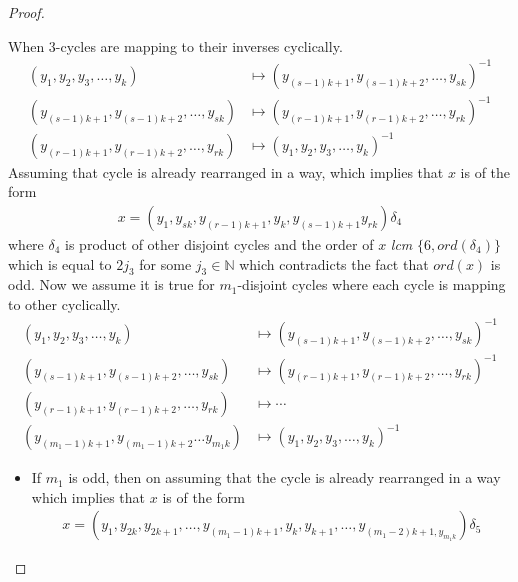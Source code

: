 \documentclass[10pt,a4paper]{amsart}
\newcommand{\ord}{ord}
\begin{document}
\begin{proof}
\begin{itemize}
\begin{itemize}
                    When $3$-cycles are mapping to their inverses cyclically.
                    \begin{align*}
                        (y_1, y_2, y_3, \ldots , y_k) &\mapsto (y_{(s- 1)k + 1}, y_{(s- 1)k + 2}, \ldots , y_{sk})^{-1}\\
                        (y_{(s- 1)k + 1}, y_{(s- 1)k + 2}, \ldots , y_{sk})&\mapsto (y_{(r- 1)k + 1}, y_{(r- 1)k + 2}, \ldots , y_{rk})^{-1}\\
                        (y_{(r- 1)k + 1}, y_{(r- 1)k + 2}, \ldots , y_{rk})&\mapsto (y_1, y_2, y_3, \ldots , y_k)^{-1}
                    \end{align*} Assuming that cycle is already rearranged in a way, which implies that $x$ is of the form
                    \begin{align*}
                        x = (y_1, y_{sk}, y_{(r - 1)k + 1}, y_k, y_{(s - 1)k + 1}y_{rk})\delta_4
                    \end{align*}
                    where $\delta_4$ is product of other disjoint cycles and the order of $x$ \textit{lcm} $\{6, \ord(\delta_4)\}$ which is equal to $2j_3$ for some $j_3 \in \mathbb{N}$ which contradicts the fact that $\ord(x)$ is odd. Now we assume it is true for $m_1$-disjoint cycles where each cycle is mapping to other cyclically.
                    \begin{align*}
                        (y_1, y_2, y_3, \ldots , y_k) &\mapsto (y_{(s- 1)k + 1}, y_{(s- 1)k + 2}, \ldots , y_{sk})^{-1}\\
                        (y_{(s- 1)k + 1}, y_{(s- 1)k + 2}, \ldots , y_{sk})&\mapsto (y_{(r- 1)k + 1}, y_{(r- 1)k + 2}, \ldots , y_{rk})^{-1}\\
                        (y_{(r- 1)k + 1}, y_{(r- 1)k + 2}, \ldots , y_{rk})&\mapsto \cdots\\
                        (y_{(m_1- 1)k + 1}, y_{(m_1- 1)k + 2} \ldots y_{m_1k})&\mapsto (y_1, y_2, y_3, \ldots , y_k)^{-1}
                    \end{align*}
                    \begin{itemize}
                        \item[Case (2.a)] If $m_1$ is odd, then on assuming that the cycle is already rearranged in a way which implies that $x$ is of the form
                        \begin{align*}
                            x = (y_1, y_{2k}, y_{2k + 1}, \ldots , y_{(m_1 - 1)k + 1}, y_k, y_{k + 1}, \ldots, y_{(m_1 - 2)k + 1, y_{m_1k}})\delta_5

\end{align*}
\end{itemize}
\end{itemize}
\end{itemize}
\end{proof}
\end{document}

